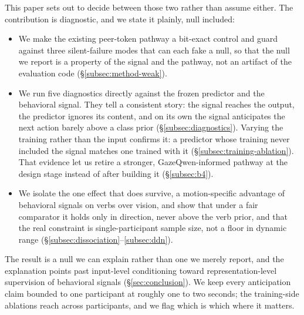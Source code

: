 This paper sets out to decide between those two rather than assume either. The
contribution is diagnostic, and we state it plainly, null included:
\begin{itemize}
  \item We make the existing peer-token pathway a bit-exact control and guard
        against three silent-failure modes that can each fake a null, so that the
        null we report is a property of the signal and the pathway, not an
        artifact of the evaluation code (\S\ref{subsec:method-weak}).
  \item We run five diagnostics directly against the frozen predictor and the
        behavioral signal. They tell a consistent story: the signal reaches the output, the predictor
        ignores its content, and on its own the signal anticipates the next
        action barely above a class prior (\S\ref{subsec:diagnostics}). Varying
        the training rather than the input confirms it: a predictor whose
        training never included the signal matches one trained with it
        (\S\ref{subsec:training-ablation}). That evidence let us retire a stronger,
        GazeQwen-informed \citep{pham2026gazeqwen} pathway at the design stage
        instead of after building it (\S\ref{subsec:b4}).
  \item We isolate the one effect that does survive, a motion-specific advantage
        of behavioral signals on verbs over vision, and show that under a fair
        comparator it holds only in direction, never above the verb prior, and
        that the real constraint is single-participant sample size, not a floor
        in dynamic range (\S\ref{subsec:dissociation}--\ref{subsec:ddn}).
\end{itemize}
The result is a null we can explain rather than one we merely report, and the
explanation points past input-level conditioning toward representation-level
supervision of behavioral signals (\S\ref{sec:conclusion}). We keep every anticipation claim bounded to one participant at roughly one to two
seconds; the training-side ablations reach across participants, and we flag which
is which where it matters.